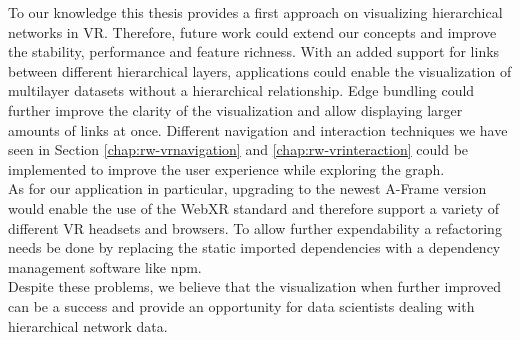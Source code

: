 To our knowledge this thesis provides a first approach on visualizing hierarchical networks in VR. Therefore, future work could extend our concepts and improve the stability, performance and feature richness.
With an added support for links between different hierarchical layers, applications could enable the visualization of multilayer datasets without a hierarchical relationship. Edge bundling could further improve the clarity of the visualization and allow displaying larger amounts of links at once. Different navigation and interaction techniques we have seen in Section \ref{chap:rw-vrnavigation} and \ref{chap:rw-vrinteraction} could be implemented to improve the user experience while exploring the graph.\
\\
As for our application in particular, upgrading to the newest A-Frame version would enable the use of the WebXR standard and therefore support a variety of different VR headsets and browsers. To allow further expendability a refactoring needs be done by replacing the static imported dependencies with a dependency management software like npm.
\\
Despite these problems, we believe that the visualization when further improved can be a success and provide an opportunity for data scientists dealing with hierarchical network data.

